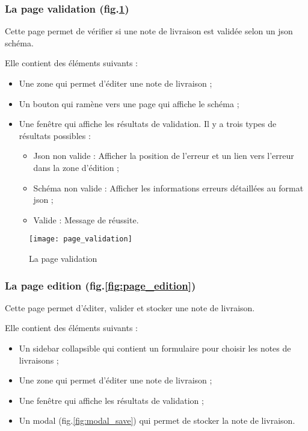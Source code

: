 \subsubsection{La page validation (fig.\ref{fig:page_validation})}
Cette page permet de vérifier si une note de livraison est validée selon un json schéma.

Elle contient des éléments suivants :
\begin{itemize}
 \item Une zone qui permet d'éditer une note de livraison ;
 \item Un bouton qui ramène vers une page qui affiche le schéma ;
 \item Une fenêtre qui affiche les résultats de validation. Il y a trois types de résultats possibles :
       \begin{itemize}
        \item Json non valide :
              Afficher la position de l'erreur et un lien vers l'erreur dans la zone d'édition ;
        \item Schéma non valide :
              Afficher les informations erreurs détaillées au format json ;
        \item Valide :
              Message de réussite.
       \end{itemize}
\end{itemize}

\begin{figure}[ht]
 \centering
 \texttt{[image: page\_validation]}
 \caption{La page validation}
 \label{fig:page_validation}
\end{figure}

\subsubsection{La page edition (fig.\ref{fig:page_edition})}
Cette page permet d'éditer, valider et stocker une note de livraison.

Elle contient des éléments suivants :
\begin{itemize}
 \item Un sidebar collapsible qui contient un formulaire pour choisir les notes de livraisons ;
 \item Une zone qui permet d'éditer une note de livraison ;
 \item Une fenêtre qui affiche les résultats de validation ;
 \item Un modal (fig.\ref{fig:modal_save}) qui permet de stocker la note de livraison.
\end{itemize}

